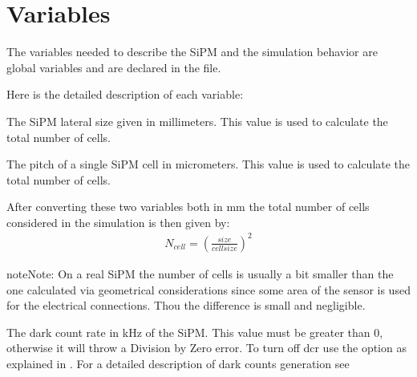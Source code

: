 \documentclass[letterpaper,10pt,english]{sphinxmanual}
\begin{document}
\chapter{Variables}
\label{\detokenize{variables:variables}}\label{\detokenize{variables::doc}}
The variables needed to describe the SiPM and the simulation behavior are global variables and are declared in the  file.

Here is the detailed description of each variable:


\begin{fulllineitems}
The SiPM lateral size given in millimeters. This value is used to calculate the total number of cells.

\end{fulllineitems}



\begin{fulllineitems}
The pitch of a single SiPM cell in micrometers. This value is used to calculate the total number of cells.

\end{fulllineitems}


After converting these two variables both in mm the total number of cells considered in the simulation is then given by:
\begin{equation*}
\begin{split}N_{cell} = \left(\frac{size}{cellsize}\right)^2\end{split}
\end{equation*}
\begin{sphinxadmonition}{note}{Note:}
On a real SiPM the number of cells is usually a bit smaller than the one calculated via geometrical considerations since some area of the sensor is used for the electrical connections. Thou the difference is small and negligible.
\end{sphinxadmonition}


\begin{fulllineitems}
The dark count rate in kHz of the SiPM. This value must be greater than 0, otherwise it will throw a Division by Zero error. To turn off dcr use the option  as explained in {\hyperref[\detokenize{setup:clineopts}]{}} . For a detailed description of dark counts generation see {\hyperref[\detokenize{theory:dcrtheory}]{}}

\end{fulllineitems}
\end{document}
